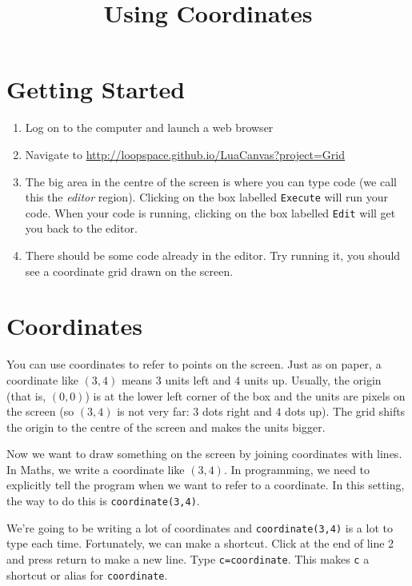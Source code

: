 \documentclass[
  xhtml,%
  text
]{internet}
\title{Using Coordinates}
\begin{document}
\maketitle
\section*{Getting Started}

\begin{enumerate}
\item Log on to the computer and launch a web browser
\item Navigate to \href{http://loopspace.github.io/LuaCanvas?project=Grid}{http://loopspace.github.io/LuaCanvas?project=Grid}
\item The big area in the centre of the screen is where you can type code (we call this the \emph{editor} region).
Clicking on the box labelled \verb+Execute+ will run your code.
When your code is running, clicking on the box labelled \verb+Edit+ will get you back to the editor.

\item There should be some code already in the editor.
Try running it, you should see a coordinate grid drawn on the screen.
\end{enumerate}

\section*{Coordinates}

You can use coordinates to refer to points on the screen.
Just as on paper, a coordinate like \((3,4)\) means \(3\) units left and \(4\) units up.
Usually, the origin (that is, \((0,0)\)) is at the lower left corner of the box and the units are pixels on the screen (so \((3,4)\) is not very far: \(3\) dots right and \(4\) dots up).
The grid shifts the origin to the centre of the screen and makes the units bigger.

Now we want to draw something on the screen by joining coordinates with lines.
In Maths, we write a coordinate like \((3,4)\).
In programming, we need to explicitly tell the program when we want to refer to a coordinate.
In this setting, the way to do this is \verb+coordinate(3,4)+.

We're going to be writing a lot of coordinates and \verb+coordinate(3,4)+ is a lot to type each time.
Fortunately, we can make a shortcut.
Click at the end of line 2 and press return to make a new line.
Type \verb+c=coordinate+.
This makes \verb+c+ a shortcut or alias for \verb+coordinate+.
\end{document}

